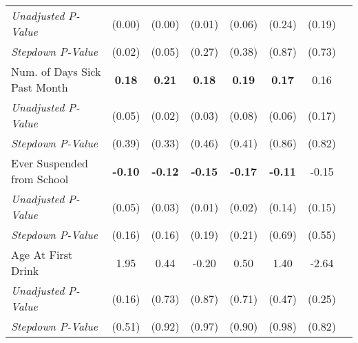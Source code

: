 \begin{tabular}{l c c c c c c c}
\quad \textit{Unadjusted P-Value} & (0.00) & (0.00) & (0.01) & (0.06) & (0.24) & (0.19) \\
\quad \textit{Stepdown P-Value} & (0.02) & (0.05) & (0.27) & (0.38) & (0.87) & (0.73) \\
Num. of Days Sick Past Month & \textbf{ 0.18 } & \textbf{ 0.21 } & \textbf{ 0.18 } & \textbf{ 0.19 } & \textbf{ 0.17 } & 0.16 \\
\quad \textit{Unadjusted P-Value} & (0.05) & (0.02) & (0.03) & (0.08) & (0.06) & (0.17) \\
\quad \textit{Stepdown P-Value} & (0.39) & (0.33) & (0.46) & (0.41) & (0.86) & (0.82) \\
Ever Suspended from School & \textbf{ -0.10 } & \textbf{ -0.12 } & \textbf{ -0.15 } & \textbf{ -0.17 } & \textbf{ -0.11 } & -0.15 \\
\quad \textit{Unadjusted P-Value} & (0.05) & (0.03) & (0.01) & (0.02) & (0.14) & (0.15) \\
\quad \textit{Stepdown P-Value} & (0.16) & (0.16) & (0.19) & (0.21) & (0.69) & (0.55) \\
Age At First Drink & 1.95 & 0.44 & -0.20 & 0.50 & 1.40 & -2.64 \\
\quad \textit{Unadjusted P-Value} & (0.16) & (0.73) & (0.87) & (0.71) & (0.47) & (0.25) \\
\quad \textit{Stepdown P-Value} & (0.51) & (0.92) & (0.97) & (0.90) & (0.98) & (0.82) \\
\bottomrule
\end{tabular}
